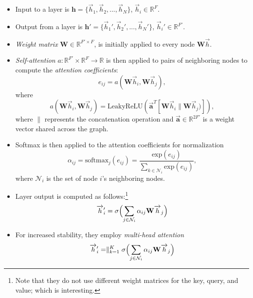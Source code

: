 \documentclass[twocolumn]{article}
\theoremstyle{plain}
\begin{document}
\begin{itemize}
    \item Input to a layer is $\mathbf{h} = \{\overrightarrow{h}_1, \overrightarrow{h}_2, ..., \overrightarrow{h}_N \}$, $\overrightarrow{h}_i \in \mathbb{R}^F$.
    \item Output from a layer is $\mathbf{h}' = \{\overrightarrow{h}_1', \overrightarrow{h}_2', ..., \overrightarrow{h}_N' \}$, $\overrightarrow{h}_i' \in \mathbb{R}^{F'}$. 
    \item \textit{Weight matrix} $\mathbf{W} \in \mathbb{R}^{F'\times F}$, is initially applied to every node $\mathbf{W}\overrightarrow{h}$.
    \item \textit{Self-attention} $a : \mathbb{R}^{F'} \times \mathbb{R}^{F} \rightarrow \mathbb{R}$ is then applied to pairs of neighboring nodes to compute the \textit{attention coefficients}:
        \begin{equation}
            e_{ij} = a(\mathbf{W}\overrightarrow{h}_i, \mathbf{W}\overrightarrow{h}_j),
        \end{equation}
        where
        \begin{equation}
            a(\mathbf{W}\overrightarrow{h}_i, \mathbf{W}\overrightarrow{h}_j) = \text{LeakyReLU}(\overrightarrow{\mathbf{a}}^T[\mathbf{W}\overrightarrow{h}_i \parallel \mathbf{W}\overrightarrow{h}_j)]),
        \end{equation}
        where $\parallel$ represents the concatenation operation and $\overrightarrow{\mathbf{a}} \in \mathbb{R}^{2F'}$ is a weight vector shared across the graph.
    \item Softmax is then applied to the attention coefficients for normalization
        \begin{equation}
            \alpha_{ij} = \text{softmax}_j(e_{ij}) = \frac{\text{exp}(e_{ij})}{\sum_{k \in \mathcal{N}_i} \text{exp}(e_{ij})},
        \end{equation}
        where $\mathcal{N}_i$ is the set of node $i$'s neighboring nodes.
    \item Layer output is computed as follows:\footnote{Note that they do not use different weight matrices for the key, query, and value; which is interesting.}
        \begin{equation}
            \overrightarrow{h}_i' = \sigma\Bigl(\sum_{j \in \mathcal{N}_i} \alpha_{ij} \mathbf{W} \overrightarrow{h}_j \Bigr)
        \end{equation}
    \item For increased stability, they employ \textit{multi-head attention}
        \begin{equation}
            \overrightarrow{h}_i' = \parallel^{K}_{k=1} \sigma\Bigl(\sum_{j \in \mathcal{N}_i} \alpha_{ij} \mathbf{W} \overrightarrow{h}_j \Bigr)
        \end{equation}
\end{itemize}
\end{document}
